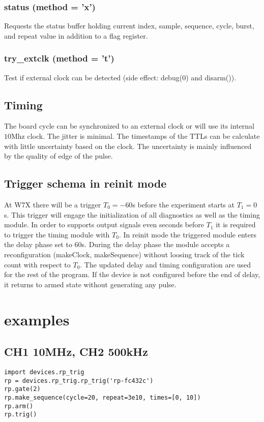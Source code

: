 \documentclass{article}
\begin{document}
\subsubsection*{status (method = 'x')}
Requests the status buffer holding current index, sample, sequence, cycle, burst, and repeat value in addition to a flag register. 
\subsubsection*{try\_extclk (method = 't')}
Test if external clock can be detected (side effect: debug(0) and disarm()). 

\subsection*{Timing}
The board cycle can be synchronized to an external clock or will use its internal $10$Mhz clock.
The jitter is minimal. The timestamps of the TTLs can be calculate with little uncertainty based on the clock. The uncertainty is mainly influenced by the quality of edge of the pulse.

\subsection*{Trigger schema in reinit mode}
At W7X there will be a trigger $T_0=-60$s before the experiment starts at $T_1=0$s. This trigger will engage the initialization of all diagnostics as well as the timing module. In order to supports output signals even seconds before $T_1$ it is required to trigger the timing module with $T_0$. In reinit mode the triggered module enters the delay phase set to $60$s. During the delay phase the module accepts a reconfiguration (makeClock, makeSequence) without loosing track of the tick count with respect to $T_0$. The updated delay and timing configuration are used for the rest of the program. If the device is not configured before the end of delay, it returns to armed state without generating any pulse.

\section{examples}
\subsection{CH1 10MHz, CH2 500kHz}
\begin{lstlisting}
import devices.rp_trig
rp = devices.rp_trig.rp_trig('rp-fc432c')
rp.gate(2)
rp.make_sequence(cycle=20, repeat=3e10, times=[0, 10])
rp.arm()
rp.trig()
\end{lstlisting}
\end{document}
